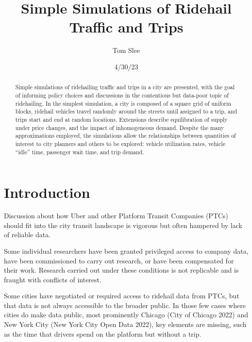 \documentclass[
  letterpaper,
  DIV=11,
  numbers=noendperiod]{scrartcl}
\title{Simple Simulations of Ridehail Traffic and Trips}
\author{Tom Slee}
\date{4/30/23}
\renewcommand*\contentsname{Table of contents}
\newcommand\contentsname{Table of contents}
\begin{document}
\maketitle
\begin{abstract}
Simple simulations of ridehailing traffic and trips in a city are
presented, with the goal of informing policy choices and discussions in
the contentious but data-poor topic of ridehailing. In the simplest
simulation, a city is composed of a square grid of uniform blocks,
ridehail vehicles travel randomly around the streets until assigned to a
trip, and trips start and end at random locations. Extensions describe
equilibration of supply under price changes, and the impact of
inhomogeneous demand. Despite the many approximations employed, the
simulations allow the relationships between quantities of interest to
city planners and others to be explored: vehicle utilization rates,
vehicle ``idle'' time, passenger wait time, and trip demand.
\end{abstract}
\ifdefined\Shaded\renewenvironment{Shaded}{\begin{tcolorbox}[frame hidden, boxrule=0pt, enhanced, interior hidden, borderline west={3pt}{0pt}{shadecolor}, sharp corners, breakable]}{\end{tcolorbox}}\fi

\renewcommand*\contentsname{Contents}
{
\hypersetup{linkcolor=}
\setcounter{tocdepth}{3}
\tableofcontents
}
\hypertarget{introduction}{%
\section{Introduction}\label{introduction}}

Discussion about how Uber and other Platform Transit Companies (PTCs)
should fit into the city transit landscape is vigorous but often
hampered by lack of reliable data.

Some individual researchers have been granted privileged access to
company data, have been commissioned to carry out research, or have been
compensated for their work. Research carried out under these conditions
is not replicable and is fraught with conflicts of interest.

Some cities have negotiated or required access to ridehail data from
PTCs, but that data is not always accessible to the broader public. In
those few cases where cities do make data public, most prominently
Chicago (City of Chicago 2022) and New York City (New York City Open
Data 2022), key elements are missing, such as the time that drivers
spend on the platform but without a trip.
\end{document}
